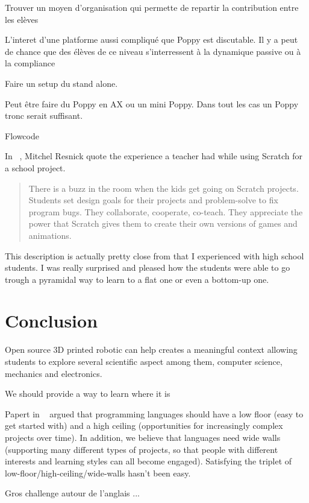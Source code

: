 Trouver un moyen d'organisation qui permette de repartir la contribution entre les elèves

L'interet d'une platforme aussi compliqué que Poppy est discutable. Il y a peut de chance que des élèves de ce niveau s'interressent à la dynamique passive ou à la compliance

Faire un setup du stand alone.

Peut être faire du Poppy en AX ou un mini Poppy. Dans tout les cas un Poppy tronc serait suffisant.

Flowcode


In ~\cite{resnick2008sowing}, Mitchel Resnick quote the experience a teacher had while using Scratch for a school project.
\begin{quotation}
    There is a buzz in the room when the kids get going on Scratch projects. Students set design goals for their projects and problem-solve to fix program bugs. They collaborate, cooperate, co-teach. They appreciate the power that Scratch gives them to create their own versions of games and animations.

\end{quotation}

This description is actually pretty close from that I experienced with high school students. I was really surprised and pleased how the students were able to go trough a pyramidal way to learn to a flat one or even a bottom-up one.







\section{Conclusion} %


Open source 3D printed robotic can help creates a meaningful context allowing students to explore several scientific aspect among them, computer science, mechanics and electronics.

We should provide a way to learn where it is

Papert in ~\cite{guzdial2004programming} argued that programming languages should have a low floor (easy to get started with) and a high ceiling (opportunities for increasingly complex projects over time). In addition, we believe that languages need wide walls (supporting many different types of projects, so that people with different interests and learning styles can all become engaged). Satisfying the triplet of low-floor/high-ceiling/wide-walls hasn’t been easy.

Gros challenge autour de l'anglais ...

